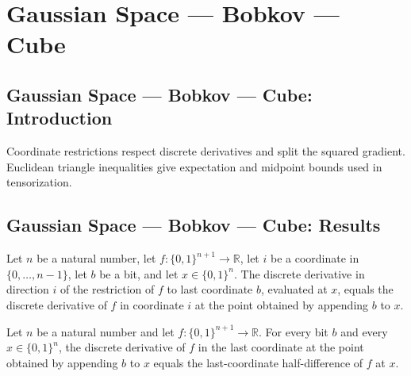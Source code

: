 \section{Gaussian Space --- Bobkov --- Cube}
\subsection*{Gaussian Space --- Bobkov --- Cube: Introduction}
Coordinate restrictions respect discrete derivatives and split the squared gradient. Euclidean triangle inequalities give expectation and midpoint bounds used in tensorization.

\subsection*{Gaussian Space --- Bobkov --- Cube: Results}

\begin{lemma}
\leanok
{}
Let $n$ be a natural number, let $f:\{0,1\}^{n+1}\to\mathbb R$, let $i$ be a coordinate
in $\{0,\ldots,n-1\}$, let $b$ be a bit, and let $x\in\{0,1\}^n$. The discrete
derivative in direction $i$ of the restriction of $f$ to last coordinate $b$, evaluated
at $x$, equals the discrete derivative of $f$ in coordinate $i$ at the point obtained by
appending $b$ to $x$.
\end{lemma}

\begin{lemma}
\leanok
{}
Let $n$ be a natural number and let $f:\{0,1\}^{n+1}\to\mathbb R$. For every bit $b$ and
every $x\in\{0,1\}^n$, the discrete derivative of $f$ in the last coordinate at the
point obtained by appending $b$ to $x$ equals the last-coordinate half-difference of $f$
at $x$.
\end{lemma}

